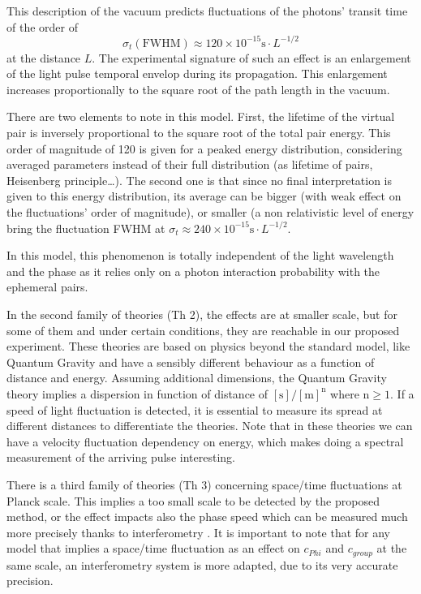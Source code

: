 \documentclass[9pt, a4, twoside]{article}
\begin{document}
This description of the vacuum predicts fluctuations of the photons' transit time of the order of
\begin{displaymath}
\sigma_t(\mathrm{FWHM}) \approx 120\times10^{-15}\mathrm{s}\cdot L^{-1/2}
\end{displaymath}
at the distance $L$. The experimental signature of such an effect is an enlargement of the light pulse temporal envelop during its propagation. This enlargement increases proportionally to the square root of the path length in the vacuum.

There are two elements to note in this model. First, the lifetime of the virtual pair is inversely proportional to the square root of the total pair energy. This order of magnitude of 120 is given for a peaked energy distribution, considering averaged parameters instead of their full distribution (as lifetime of pairs, Heisenberg principle\ldots). The second one is that since no final interpretation is given to this energy distribution, its average can be bigger (with weak effect on the fluctuations' order of magnitude), or smaller (a non relativistic level of energy bring the fluctuation FWHM at $\sigma_t \approx 240\times10^{-15}\mathrm{s}\cdot L^{-1/2} $.

In this model, this phenomenon is totally independent of the light wavelength and the phase as it relies only on a photon interaction probability with the ephemeral pairs.

In the second family of theories (Th 2), the effects are at smaller scale, but for some of them and under certain conditions, they are reachable in our proposed experiment. These theories are based on physics beyond the standard model, like Quantum Gravity \cite{gravcite} and have a sensibly different behaviour as a function of distance and energy.
Assuming additional dimensions, the Quantum Gravity theory implies a dispersion in function of distance of $[\mathrm{s}]/[\mathrm{m}]^\mathrm{n}$ where $\mathrm{n} \geq 1$. If a speed of light fluctuation is detected, it is essential to measure its spread at different distances to differentiate the theories. Note that in these theories we can have a velocity fluctuation dependency on energy, which makes doing a spectral measurement of the arriving pulse interesting.

There is a third family of theories (Th 3) concerning space/time fluctuations at Planck scale. This implies a too small scale to be detected by the proposed method, or the effect impacts also the phase speed which can be measured much more precisely thanks to interferometry \cite{th3}.
It is important to note that for any model that implies a space/time fluctuation as an effect on $c_{Phi}$ and $c_{group}$ at the same scale, an interferometry system is more adapted, due to its very accurate precision.
\end{document}
